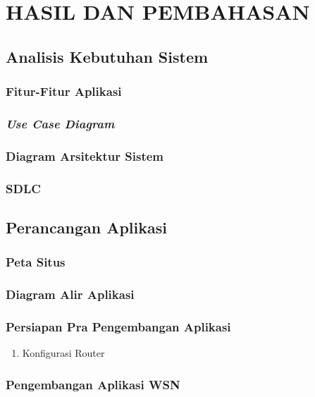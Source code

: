 
\chapter{HASIL DAN PEMBAHASAN}
	\section{Analisis Kebutuhan Sistem}
		\subsection{Fitur-Fitur Aplikasi}
		\subsection{\emph{Use Case Diagram}}
		\subsection{Diagram Arsitektur Sistem}
		\subsection{SDLC}
	
	\section{Perancangan Aplikasi}
		\subsection{Peta Situs}
		\subsection{Diagram Alir Aplikasi}
		\subsection{Persiapan Pra Pengembangan Aplikasi}
			\begin{enumerate}
				\item Konfigurasi Router
			\end{enumerate}
		\subsection{Pengembangan Aplikasi WSN}
